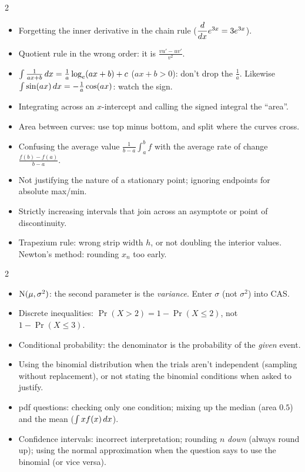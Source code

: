 \begin{warn}[Calculus]
\begin{multicols}{2}
\begin{itemize}
  \item Forgetting the inner derivative in the chain rule ($\dfrac{d}{dx} e^{3x}=3e^{3x}$).
  \item Quotient rule in the wrong order: it is $\frac{vu'-uv'}{v^2}$.
  \item $\int\frac{1}{ax+b}\,dx=\frac1a\log_e(ax+b)+c$ ($ax+b>0$): don't drop the $\frac1a$. Likewise $\int\sin(ax)\,dx=-\frac1a\cos(ax)$: watch the sign.
  \item Integrating across an $x$-intercept and calling the signed integral the ``area''.
  \item Area between curves: use top minus bottom, and split where the curves cross.
  \item Confusing the average value $\frac{1}{b-a}\int_a^bf$ with the average rate of change $\frac{f(b)-f(a)}{b-a}$.
  \item Not justifying the nature of a stationary point; ignoring endpoints for absolute max/min.
  \item Strictly increasing intervals that join across an asymptote or point of discontinuity.
  \item Trapezium rule: wrong strip width $h$, or not doubling the interior values. Newton's method: rounding $x_n$ too early.
\end{itemize}
\end{multicols}
\end{warn}
\begin{warn}
\begin{multicols}{2}
\begin{itemize}
  \item $\mathrm{N}(\mu,\sigma^2)$: the second parameter is the \emph{variance}. Enter $\sigma$ (not $\sigma^2$) into CAS.
  \item Discrete inequalities: $\Pr(X>2)=1-\Pr(X\le2)$, not $1-\Pr(X\le3)$.
  \item Conditional probability: the denominator is the probability of the \emph{given} event.
  \item Using the binomial distribution when the trials aren't independent (sampling without replacement), or not stating the binomial conditions when asked to justify.
  \item pdf questions: checking only one condition; mixing up the median (area $0.5$) and the mean ($\int xf(x)\,dx$).
  \item Confidence intervals: incorrect interpretation; rounding $n$ \emph{down} (always round up); using the normal approximation when the question says to use the binomial (or vice versa).
\end{itemize}
\end{multicols}
\end{warn}

